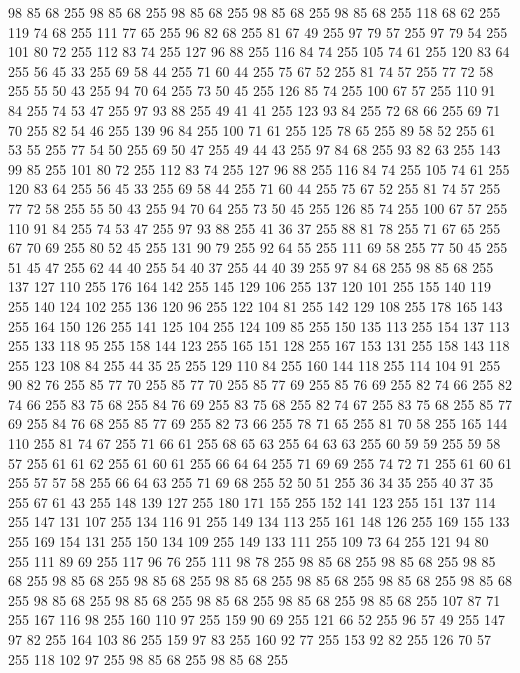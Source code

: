98 85 68 255 98 85 68 255 98 85 68 255 98 85 68 255 98 85 68 255 118 68 62 255 119 74 68 255 111 77 65 255 96 82 68 255 81 67 49 255 97 79 57 255 97 79 54 255 101 80 72 255 112 83 74 255 127 96 88 255 116 84 74 255 105 74 61 255 120 83 64 255 56 45 33 255 69 58 44 255 71 60 44 255 75 67 52 255 81 74 57 255 77 72 58 255 55 50 43 255 94 70 64 255 73 50 45 255 126 85 74 255 100 67 57 255 110 91 84 255 74 53 47 255 97 93 88 255 49 41 41 255 123 93 84 255 72 68 66 255 69 71 70 255 82 54 46 255 139 96 84 255 100 71 61 255 125 78 65 255 89 58 52 255 61 53 55 255 77 54 50 255 69 50 47 255 49 44 43 255 97 84 68 255 93 82 63 255 143 99 85 255 101 80 72 255 112 83 74 255 127 96 88 255 116 84 74 255 105 74 61 255 120 83 64 255 56 45 33 255 69 58 44 255 71 60 44 255 75 67 52 255 81 74 57 255 77 72 58 255 55 50 43 255 94 70 64 255 73 50 45 255 126 85 74 255
100 67 57 255 110 91 84 255 74 53 47 255 97 93 88 255 41 36 37 255 88 81 78 255 71 67 65 255 67 70 69 255 80 52 45 255 131 90 79 255 92 64 55 255 111 69 58 255 77 50 45 255 51 45 47 255 62 44 40 255 54 40 37 255 44 40 39 255 97 84 68 255 98 85 68 255 137 127 110 255 176 164 142 255 145 129 106 255 137 120 101 255 155 140 119 255 140 124 102 255 136 120 96 255 122 104 81 255 142 129 108 255 178 165 143 255 164 150 126 255 141 125 104 255 124 109 85 255 150 135 113 255 154 137 113 255 133 118 95 255 158 144 123 255 165 151 128 255 167 153 131 255 158 143 118 255 123 108 84 255 44 35 25 255 129 110 84 255 160 144 118 255 114 104 91 255 90 82 76 255 85 77 70 255 85 77 70 255 85 77 69 255 85 76 69 255 82 74 66 255 82 74 66 255 83 75 68 255 84 76 69 255 83 75 68 255 82 74 67 255 83 75 68 255 85 77 69 255 84 76 68 255 85 77 69 255 82 73 66 255 78 71 65 255 81 70 58 255 165 144 110 255 81 74 67 255
71 66 61 255 68 65 63 255 64 63 63 255 60 59 59 255 59 58 57 255 61 61 62 255 61 60 61 255 66 64 64 255 71 69 69 255 74 72 71 255 61 60 61 255 57 57 58 255 66 64 63 255 71 69 68 255 52 50 51 255 36 34 35 255 40 37 35 255 67 61 43 255 148 139 127 255 180 171 155 255 152 141 123 255 151 137 114 255 147 131 107 255 134 116 91 255 149 134 113 255 161 148 126 255 169 155 133 255 169 154 131 255 150 134 109 255 149 133 111 255 109 73 64 255 121 94 80 255 111 89 69 255 117 96 76 255 111 98 78 255 98 85 68 255 98 85 68 255 98 85 68 255 98 85 68 255 98 85 68 255 98 85 68 255 98 85 68 255 98 85 68 255 98 85 68 255 98 85 68 255 98 85 68 255 98 85 68 255 98 85 68 255 98 85 68 255 107 87 71 255 167 116 98 255 160 110 97 255 159 90 69 255 121 66 52 255 96 57 49 255 147 97 82 255 164 103 86 255 159 97 83 255 160 92 77 255 153 92 82 255 126 70 57 255 118 102 97 255 98 85 68 255 98 85 68 255
